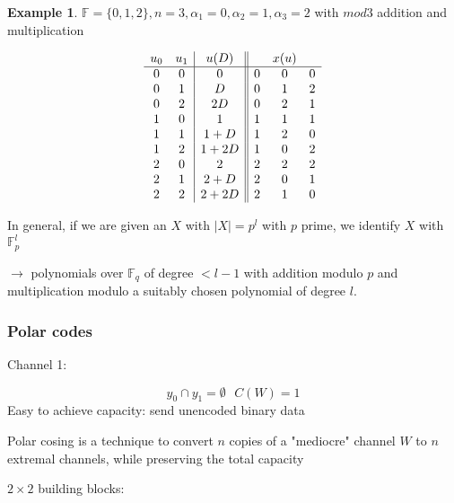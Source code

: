 \documentclass{article}
\theoremstyle{definition} %
\newtheorem{example}{Example}
\def\F{\mathbb{F}}
\begin{document}
\begin{example}
  $\F = \{ 0, 1, 2 \}, n = 3, \alpha_1 = 0, \alpha_2 = 1, \alpha_3 = 2$ with $mod 3$ addition and multiplication

  \begin{align*}
    \begin{array}{c c | c || c c c }
      u_0 & u_1 & u(D) & & x(u) \\
      \hline
     0 & 0 & 0      & 0 & 0 & 0  \\
     0 & 1 & D      & 0 & 1 & 2  \\
     0 & 2 & 2D     & 0 & 2 & 1  \\
     1 & 0 & 1      & 1 & 1 & 1  \\
     1 & 1 & 1 + D  & 1 & 2 & 0  \\
     1 & 2 & 1 + 2D & 1 & 0 & 2  \\
     2 & 0 & 2      & 2 & 2 & 2  \\
     2 & 1 & 2 + D  & 2 & 0 & 1  \\
     2 & 2 & 2 + 2D & 2 & 1 & 0  \\
    \end{array}
  \end{align*}
\end{example}

In general, if we are given an $X$ with $|X| = p^l$ with $p$ prime, we identify $X$ with $\F_p^l$

$\rightarrow$ polynomials over $\F_q$ of degree $< l - 1$ with addition modulo $p$ and multiplication modulo a suitably chosen polynomial of degree $l$.


\subsubsection{Polar codes}

Channel 1:

\[
  y_0 \cap y_1 = \emptyset~~~C(W)=1
\]
Easy to achieve capacity: send unencoded binary data

Polar cosing is a technique to convert $n$ copies of a "mediocre" channel $W$ to $n$ extremal channels, while preserving the total capacity

$2\times 2$ building blocks:
\end{document}
